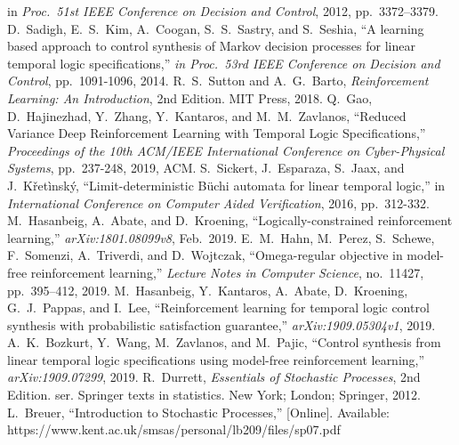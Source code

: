 \documentclass[letterpaper, 10 pt, conference]{ieeeconf}  %
\begin{document}
\begin{thebibliography}{99}
in \textit{Proc.\ 51st IEEE Conference on Decision and Control}, 2012, pp.\ 3372--3379.
D.\ Sadigh, E.\ S.\ Kim, A.\ Coogan, S.\ S.\ Sastry, and S.\ Seshia,
``A learning based approach to control synthesis of Markov decision processes for linear temporal logic specifications,''
\textit{in Proc.\ 53rd IEEE Conference on Decision and Control}, pp.\ 1091-1096, 2014.
R.\ S.\ Sutton and A.\ G.\ Barto,
\textit{Reinforcement Learning: An Introduction}, 2nd Edition.
MIT Press, 2018.
Q.\ Gao, D.\ Hajinezhad, Y.\ Zhang, Y.\ Kantaros, and M.\ M.\ Zavlanos, ``Reduced Variance Deep Reinforcement Learning with Temporal Logic Specifications,''
\textit{Proceedings of the 10th ACM/IEEE International Conference on Cyber-Physical Systems}, pp.\ 237-248, 2019, ACM.
S.\ Sickert, J.\ Esparaza, S.\ Jaax, and J.\ K\v{r}et\`{i}nsk\'{y},
``Limit-deterministic B\"{u}chi automata for linear temporal logic,''
 in \textit{International Conference on Computer Aided Verification}, 2016, pp.\ 312-332.
M.\ Hasanbeig, A.\ Abate, and D.\ Kroening,
``Logically-constrained reinforcement learning,'' \textit{arXiv:1801.08099v8}, Feb.\ 2019.
E.\ M.\ Hahn, M.\ Perez, S.\ Schewe, F.\ Somenzi, A.\ Triverdi, and D.\ Wojtczak,
``Omega-regular objective in model-free reinforcement learning,''
\textit{Lecture Notes in Computer Science}, no.\ 11427, pp.\ 395--412, 2019.
M.\ Hasanbeig, Y.\ Kantaros, A.\ Abate, D.\ Kroening, G.\ J.\ Pappas, and I.\ Lee,
``Reinforcement learning for temporal logic control synthesis with probabilistic satisfaction guarantee,''
\textit{arXiv:1909.05304v1}, 2019.
A.\ K.\ Bozkurt, Y.\ Wang, M.\ Zavlanos, and M.\ Pajic,
``Control synthesis from linear temporal logic specifications using model-free reinforcement learning,''
\textit{arXiv:1909.07299}, 2019.
R.\ Durrett,
\textit{Essentials of Stochastic Processes}, 2nd Edition. ser. Springer texts in statistics. New York; London; Springer, 2012.
L.\ Breuer,
``Introduction to Stochastic Processes,'' [Online]. Available: https://www.kent.ac.uk/smsas/personal/lb209/files/sp07.pdf

\end{thebibliography}
\end{document}
